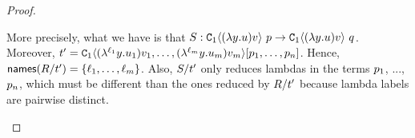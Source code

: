\begin{proof}
\begin{gonzaenv}
\begin{enumerate}
\begin{enumerate}
        More precisely, what we have is that
        $\redextwo : \con_1\of{(\lam{\vartwo}{\tmthree}) \tmthreevariant} \ \tmfive
          \to \con_1\of{(\lam{\vartwo}{\tmthree}) \tmthreevariant} \ \tmsix$.
        Moreover,
        $t' = \mathtt{C}_1\langle
          (\lambda^{\ell_1} y. u_1) v_1, \hdots,
          (\lambda^{\ell_m} y. u_m) v_m
        \rangle [p_1, \hdots, p_n]$.
        Hence, $\mathsf{names}(R / t') = \{\ell_1, \hdots, \ell_m\}$. Also, $S / t'$
        only reduces lambdas in the terms $p_1$, ..., $p_n$, which must be different
        than the ones reduced by $R / t'$ because lambda labels are pairwise distinct.
    \end{enumerate}
\end{enumerate}
\end{gonzaenv}
\end{proof}

